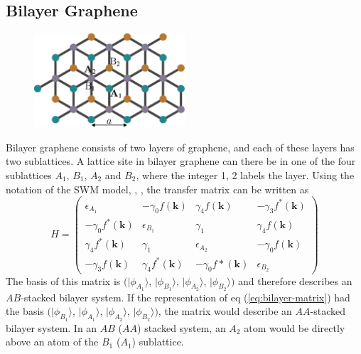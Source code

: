\subsection{Bilayer Graphene}
\begin{figure}
\centering
\includegraphics[width=0.5\textwidth]{figure/numericalframework/graphene_lattice_bi_layer_top_csch}
\end{figure}
Bilayer graphene consists of two layers of graphene, and each of these layers has two sublattices. A lattice site in bilayer graphene can there be in one of the four sublattices $A_1$, $B_1$, $A_2$ and $B_2$, where the integer 1, 2 labels the layer. Using the notation of the SWM model, \cite{McClure1957}, \cite{McClure1960}, the transfer matrix can be written as
\begin{equation}
H =  \begin{pmatrix} \epsilon_{A_1} & - \gamma_0 f \left( \mathbf{k} \right) & \gamma_4 f \left( \mathbf{k} \right) & - \gamma_3 f^*\left( \mathbf{k} \right) \\
- \gamma_0 f^* \left( \mathbf{k} \right) & \epsilon_{B_1} & \gamma_1 & \gamma_4 f \left( \mathbf{k} \right) \\
\gamma_4 f^* \left( \mathbf{k} \right) & \gamma_1 & \epsilon_{A_2} & - \gamma_0 f \left( \mathbf{k} \right)  \\
- \gamma_3 f \left( \mathbf{k} \right) & \gamma_4 f^* \left( \mathbf{k} \right)& -\gamma_0 f* \left( \mathbf{k} \right)& \epsilon_{B_2} \end{pmatrix} \label{eq:bilayer-matrix}
\end{equation}
The basis  of this matrix is  $( |\phi_{A_1}\rangle$, $|\phi_{B_1}\rangle$, $|\phi_{A_2}\rangle$, $|\phi_{B_2}\rangle )$ and therefore describes an $AB$-stacked bilayer system. If the representation of eq (\ref{eq:bilayer-matrix}) had the basis $( |\phi_{B_1}\rangle$, $|\phi_{A_1}\rangle$, $|\phi_{A_2}\rangle$, $|\phi_{B_2}\rangle )$, the matrix would describe an $AA$-stacked bilayer system. %
In an $AB$ ($AA$) stacked system, an $A_2$ atom would be directly above an atom of the $B_1$ ($A_1$) sublattice.
